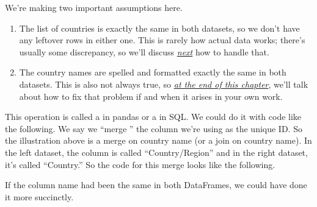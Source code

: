 \documentclass[letterpaper,10pt,english]{sphinxmanual}
\begin{document}
We’re making two important assumptions here.
\begin{enumerate}
%
\item {} 
The list of countries is exactly the same in both datasets, so we don’t have any leftover rows in either one.  This is rarely how actual data works; there’s usually some discrepancy, so we’ll discuss {\hyperref[\detokenize{chapter-12-concat-and-merge:when-there-is-no-match-for-some-rows}]{\emph{next}}} how to handle that.

\item {} 
The country names are spelled and formatted exactly the same in both datasets.  This is also not always true, so {\hyperref[\detokenize{chapter-12-concat-and-merge:ensuring-a-unique-id-appears-in-both-datasets}]{\emph{at the end of this chapter}}}, we’ll talk about how to fix that problem if and when it arises in your own work.

\end{enumerate}

This operation is called a  in pandas or a  in SQL.  We could do it with code like the following.  We say we “merge ” the column we’re using as the unique ID.  So the illustration above is a merge on country name (or a join on country name).  In the left dataset, the column is called “Country/Region” and in the right dataset, it’s called “Country.”  So the code for this merge looks like the following.

\begin{sphinxVerbatim}[commandchars=\\\{\}]
    
      
\end{sphinxVerbatim}

If the column name had been the same in both DataFrames, we could have done it more succinctly.

\begin{sphinxVerbatim}[commandchars=\\\{\}]
      
\end{sphinxVerbatim}
\end{document}
